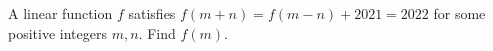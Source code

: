 A linear function $f$ satisfies $f(m+n)=f(m-n)+2021=2022$ for some positive integers $m,n$. Find $f(m)$.
